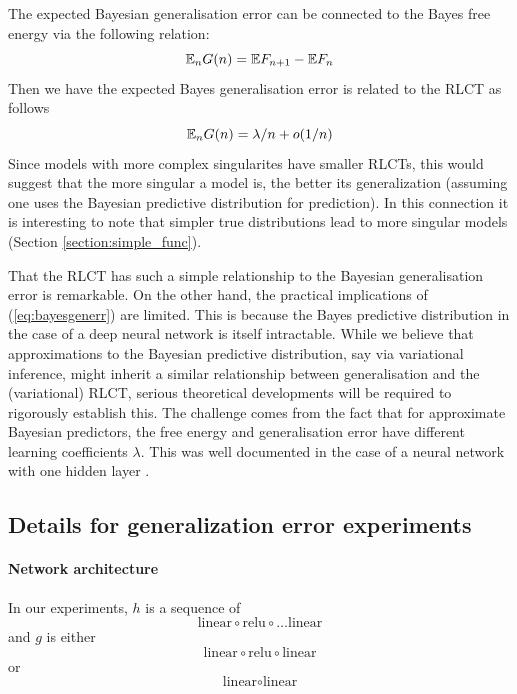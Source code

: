 \documentclass{article} %
\begin{document}
The expected Bayesian generalisation error can be connected to the Bayes free energy via the following relation:
\[
{\mathbb{E}}_n G(n) = \mathbb{E} F_{n+1} - \mathbb{E} F_n 
\]
Then we have the expected Bayes generalisation error is related to the RLCT as follows
\begin{equation}
{\mathbb{E}}_n G(n) = \lambda/n + o(1/n)
\label{eq:bayesgenerr}
\end{equation}
Since models with more complex singularites have smaller RLCTs, this would suggest that the more singular a model is, the better its generalization (assuming one uses the Bayesian predictive distribution for prediction). In this connection it is interesting to note that simpler true distributions lead to more singular models (Section \ref{section:simple_func}).

That the RLCT has such a simple relationship to the Bayesian generalisation error is remarkable. On the other hand, the practical implications of (\ref{eq:bayesgenerr}) are limited. This is because the Bayes predictive distribution in the case of a deep neural network is itself intractable. While we believe that approximations to the Bayesian predictive distribution, say via variational inference, might inherit a similar relationship between generalisation and the (variational) RLCT, serious theoretical developments will be required to rigorously establish this. The challenge comes from the fact that for approximate Bayesian predictors, the free energy and generalisation error have different learning coefficients $\lambda$. This was well documented in the case of a neural network with one hidden layer \citep{nakajima_variational_2007}. 

\subsection{Details for generalization error experiments}
\label{appendix:generalizaton}

\paragraph{Network architecture} In our experiments, $h$ is a sequence of 
\[
\text{linear} \circ \text{relu} \circ \ldots \text{linear}
\]
and $g$ is either
\begin{equation}
    \text{linear} \circ \text{relu} \circ \text{linear} 
\end{equation}
or
\begin{equation}
    \text{linear}  \circ \text{linear} 
\end{equation}
\end{document}
